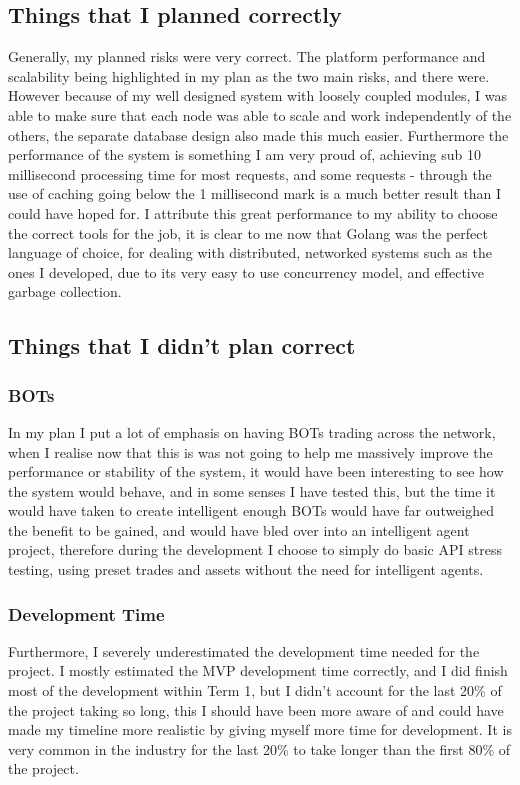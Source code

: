 \documentclass[titlepage]{article}
\begin{document}
\subsection{Things that I planned correctly}
Generally, my planned risks were very correct. The platform performance and scalability being highlighted in my plan as the two main risks, and there were. However because of my well designed system with loosely coupled modules, I was able to make sure that each node was able to scale and work independently of the others, the separate database design also made this much easier. Furthermore the performance of the system is something I am very proud of, achieving sub 10 millisecond processing time for most requests, and some requests - through the use of caching going below the 1 millisecond mark is a much better result than I could have hoped for. I attribute this great performance to my ability to choose the correct tools for the job, it is clear to me now that Golang was the perfect language of choice, for dealing with distributed, networked systems such as the ones I developed, due to its very easy to use concurrency model, and effective garbage collection. \\

\subsection{Things that I didn't plan correct}

\subsubsection{BOTs}
In my plan I put a lot of emphasis on having BOTs trading across the network, when I realise now that this is was not going to help me massively improve the performance or stability of the system, it would have been interesting to see how the system would behave, and in some senses I have tested this, but the time it would have taken to create intelligent enough BOTs would have far outweighed the benefit to be gained, and would have bled over into an intelligent agent project, therefore during the development I choose to simply do basic API stress testing, using preset trades and assets without the need for intelligent agents. \\

\subsubsection{Development Time}
Furthermore, I severely underestimated the development time needed for the project. I mostly estimated the MVP development time correctly, and I did finish most of the development within Term 1, but I didn't account for the last 20\% of the project taking so long, this I should have been more aware of and could have made my timeline more realistic by giving myself more time for development. It is very common in the industry for the last 20\% to take longer than the first 80\% of the project.
\end{document}
